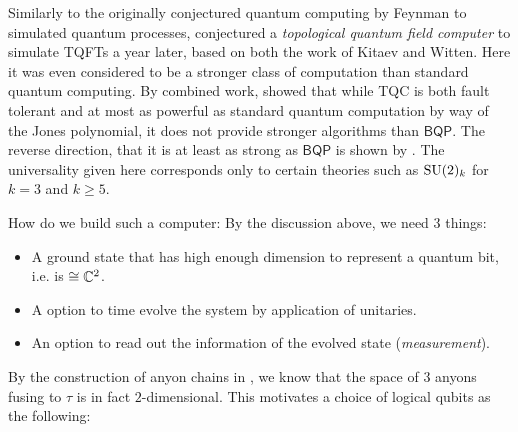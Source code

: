Similarly to the originally conjectured quantum computing by Feynman to
simulated quantum processes, \textcite{freedmanNPQuantumField1998} conjectured a
\emph{topological quantum field computer} to simulate TQFTs a year later, based
on both the work of Kitaev and Witten. Here it was even considered to be a
stronger class of computation than standard quantum computing. By combined work,
\textcite{freedmanSimulationTopologicalField2002} showed that while TQC is both
fault tolerant and at most as powerful as standard quantum computation by way of
the Jones polynomial, it does not provide stronger algorithms than
$\mathsf{BQP}$. The reverse direction, that it is at least as strong as
$\mathsf{BQP}$ is shown by \textcite{freedmanModularFunctorWhich2000a}. The
universality given here corresponds only to certain theories such as $\mathrm{SU}(2)_k$
for $k = 3$ and $k\geq 5$.


How do we build such a computer: By the discussion above, we need 3 things:

\begin{itemize}
  \item A ground state that has high enough dimension to represent a quantum
  bit, i.e. is $\cong \mathbb{C}^2$.
  \item A option to time evolve the system by application of unitaries.
  \item An option to read out the information of the evolved state
  (\emph{measurement}).
\end{itemize}


By the construction of anyon chains in
, we know that the space of $3$
anyons fusing to $\tau$ is in fact $2$-dimensional. This motivates a choice of
logical qubits as the following:


